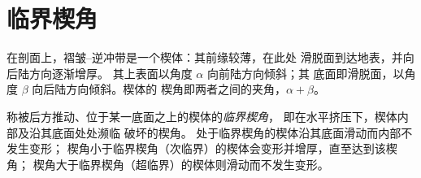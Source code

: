 \begin{omfigure}
\par{}\label{fig:b3:orogenic-wedges:duplex}
\end{omfigure}


\section{临界楔角}\label{sec:b3:orogenic-wedges:taper}

在剖面上，褶皱–逆冲带是一个楔体：其前缘较薄，在此处
滑脱面到达地表，并向后陆方向逐渐增厚。
其上表面以角度 $\alpha$ 向前陆方向倾斜；其
底面即滑脱面，以角度 $\beta$ 向后陆方向倾斜。楔体的
楔角即两者之间的夹角，$\alpha + \beta$。

\begin{definition}[临界楔角]\label{def:b3:orogenic-wedges:critical-taper}
称被后方推动、位于某一底面之上的楔体的\emph{临界楔角}，
即在水平挤压下，楔体内部及沿其底面处处濒临
破坏的楔角。
处于临界楔角的楔体沿其底面滑动而内部不发生变形；
楔角小于临界楔角（次临界）的楔体会变形并增厚，直至达到该楔角；
楔角大于临界楔角（超临界）的楔体则滑动而不发生变形。
\end{definition}

